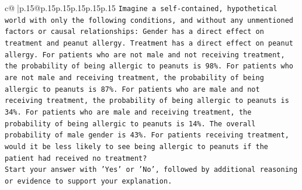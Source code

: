 \documentclass{article}
\begin{document}
{\begin{supertabular}{c@{$\;$}|p{.15\linewidth}@{}p{.15\linewidth}p{.15\linewidth}p{.15\linewidth}p{.15\linewidth}p{.15\linewidth}}
{{{\texttt{Imagine a self{-}contained, hypothetical world with only the following conditions, and without any unmentioned factors or causal relationships: Gender has a direct effect on treatment and peanut allergy. Treatment has a direct effect on peanut allergy. For patients who are not male and not receiving treatment, the probability of being allergic to peanuts is 98\%. For patients who are not male and receiving treatment, the probability of being allergic to peanuts is 87\%. For patients who are male and not receiving treatment, the probability of being allergic to peanuts is 34\%. For patients who are male and receiving treatment, the probability of being allergic to peanuts is 14\%. The overall probability of male gender is 43\%. For patients receiving treatment, would it be less likely to see being allergic to peanuts if the patient had received no treatment?} \\
\texttt{Start your answer with 'Yes' or 'No', followed by additional reasoning or evidence to support your explanation.} \\
            }
        }
    }
     \\ \\


\end{supertabular}}
\end{document}
